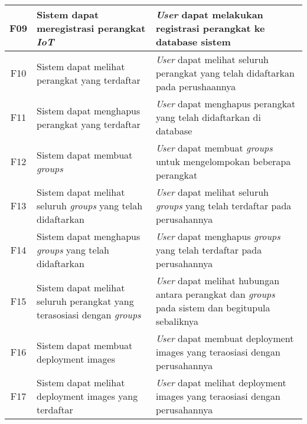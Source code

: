 \begin{table}
\begin{tabular}{|c|p{4.5cm}|p{8cm}|}
    \hline
    F09 & Sistem dapat meregistrasi perangkat \textit{IoT}                 & \textit{User} dapat melakukan registrasi perangkat ke database sistem                 \\
    \hline
    F10 & Sistem dapat melihat perangkat yang terdaftar                                  & \textit{User} dapat melihat seluruh perangkat yang telah didaftarkan pada perushaannya                          \\
    \hline
    F11 & Sistem dapat menghapus perangkat yang terdaftar                                & \textit{User} dapat menghapus perangkat yang telah didaftarkan di database                                      \\
    \hline
    F12 & Sistem dapat membuat \textit{groups}                                           & \textit{User} dapat membuat \textit{groups} untuk mengelompokan beberapa perangkat                              \\
    \hline
    F13 & Sistem dapat melihat seluruh \textit{groups} yang telah didaftarkan            & \textit{User} dapat melihat seluruh \textit{groups} yang telah terdaftar pada perusahannya                      \\
    \hline
    F14 & Sistem dapat menghapus \textit{groups} yang telah didaftarkan                  & \textit{User} dapat menghapus \textit{groups} yang telah terdaftar pada perusahannya                            \\
    \hline
    F15 & Sistem dapat melihat seluruh perangkat yang terasosiasi dengan \textit{groups} & \textit{User} dapat melihat hubungan antara perangkat dan \textit{groups} pada sistem dan begitupula sebaliknya \\
    \hline
    F16 & Sistem dapat membuat deployment images                                         & \textit{User} dapat membuat deployment images yang teraosiasi dengan perusahannya                               \\
    \hline
    F17 & Sistem dapat melihat deployment images yang terdaftar                          & \textit{User} dapat melihat deployment images yang teraosiasi dengan perusahannya                               \\
    \hline
  \end{tabular}
\end{table}

